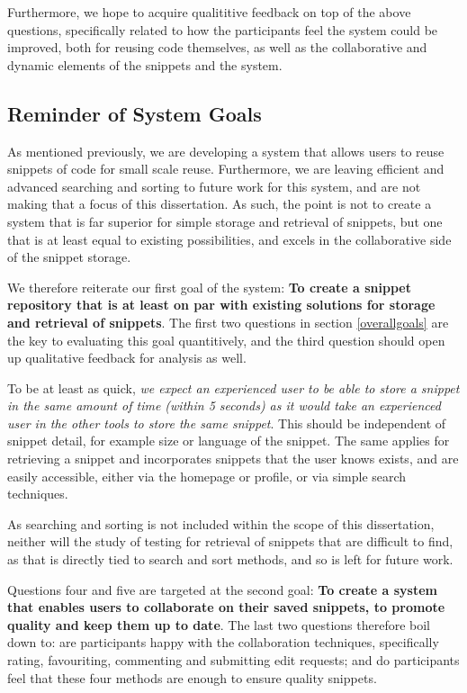 Furthermore, we hope to acquire qualititive feedback on top of the above questions, specifically related to how the participants feel the system could be improved, both for reusing code themselves, as well as the collaborative and dynamic elements of the snippets and the system.

\subsection{Reminder of System Goals} \label{reminderofgoals}
As mentioned previously, we are developing a system that allows users to reuse snippets of code for small scale reuse.
Furthermore, we are leaving efficient and advanced searching and sorting to future work for this system, and are not making that a focus of this dissertation.
As such, the point is not to create a system that is far superior for simple storage and retrieval of snippets, but one that is at least equal to existing possibilities, and excels in the collaborative side of the snippet storage.

We therefore reiterate our first goal of the system: \textbf{To create a snippet repository that is at least on par with existing solutions for storage and retrieval of snippets}.
The first two questions in section \ref{overallgoals} are the key to evaluating this goal quantitively, and the third question should open up qualitative feedback for analysis as well.

To be at least as quick, \textit{we expect an experienced user to be able to store a snippet in the same amount of time (within 5 seconds) as it would take an experienced user in the other tools to store the same snippet}.
This should be independent of snippet detail, for example size or language of the snippet.
The same applies for retrieving a snippet and incorporates snippets that the user knows exists, and are easily accessible, either via the homepage or profile, or via simple search techniques.

As searching and sorting is not included within the scope of this dissertation, neither will the study of testing for retrieval of snippets that are difficult to find, as that is directly tied to search and sort methods, and so is left for future work.

Questions four and five are targeted at the second goal: \textbf{To create a system that enables users to collaborate on their saved snippets, to promote quality and keep them up to date}.
The last two questions therefore boil down to: are participants happy with the collaboration techniques, specifically rating, favouriting, commenting and submitting edit requests; and do participants feel that these four methods are enough to ensure quality snippets.

